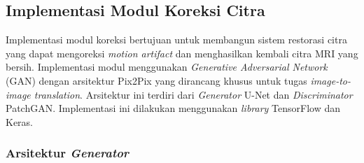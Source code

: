 %	
%	
%	
%	
%	


\subsection{Implementasi Modul Koreksi Citra}

Implementasi modul koreksi bertujuan untuk membangun sistem restorasi citra yang dapat mengoreksi \textit{motion artifact} dan menghasilkan kembali citra MRI yang bersih. Implementasi modul menggunakan \textit{Generative Adversarial Network} (GAN) dengan arsitektur Pix2Pix yang dirancang khusus untuk tugas \textit{image-to-image translation}. Arsitektur ini terdiri dari \textit{Generator} U-Net dan \textit{Discriminator} PatchGAN. Implementasi ini dilakukan menggunakan \textit{library} TensorFlow dan Keras.

\subsubsection{Arsitektur \textit{Generator}}

